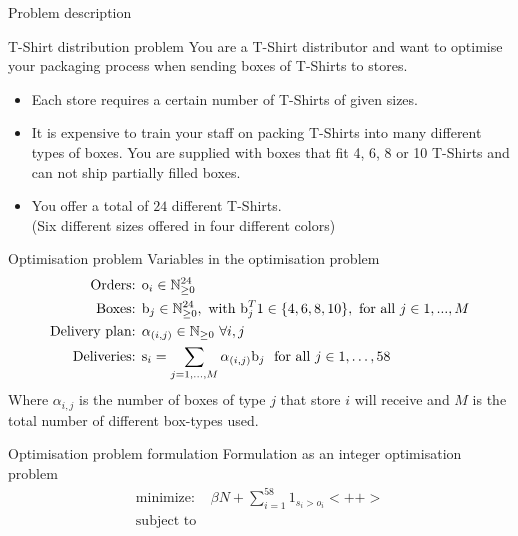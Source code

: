 \begin{frame}{Problem description}
    \begin{block}{T-Shirt distribution problem}
        You are a T-Shirt distributor and want to optimise your packaging
        process when sending boxes of T-Shirts to stores.
        \begin{itemize}
            \item Each store requires a
            certain number of T-Shirts of given sizes.
            \item It is expensive to train your staff on packing T-Shirts into many
            different types of boxes. You are supplied with boxes that fit 4, 6, 8
            or 10 T-Shirts and can not ship partially filled boxes.
            \item You offer a total of $24$ different T-Shirts.\\
                \hfill(Six different sizes offered in four different colors)
        \end{itemize}
    \end{block}
\end{frame}

\begin{frame}{Optimisation problem}
    Variables in the optimisation problem
    \begin{align*}
        \text{Orders: }& \text{o}_i \in \mathbb{N}_{\geq 0}^{24}\\
        \text{Boxes: }& \text{b}_j \in \mathbb{N}_{\geq 0}^{24}, \text{ with }
        \text{b}_j^T 1 \in \{4, 6, 8, 10\}, \text{ for all } j \in 1,...,M\\
        \text{Delivery plan: }& \alpha_{(i,j)}\in \mathbb{N}_{\geq 0}~ \forall i, j\\
        \text{Deliveries: }& \text{s}_i =
        \sum_{j = 1,\dots,M}\alpha_{(i,j)}\text{b}_j~\text{ for all } j \in 1,\dots,58\\
    \end{align*}
    Where $\alpha_{i,j}$ is the number of boxes of type $j$ that store $i$ will
    receive and $M$ is the total number of different box-types used.
\end{frame}

\begin{frame}{Optimisation problem formulation}
    Formulation as an integer optimisation problem
    \begin{align*}
        \text{minimize: } & \beta N + \sum_{i = 1}^{58} 1_{s_i > o_i}<++>\\
        \text{subject to}
    \end{align*}
\end{frame}

